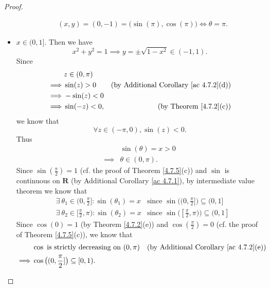 \begin{proof}
\begin{itemize}
\begin{align*}
                   & (x, y) = (0, -1) = \big(\sin(\pi), \cos(\pi)\big) \iff \theta = \pi.
              \end{align*}
        \item \(x \in (0, 1]\).
              Then we have
              \[
                  x^2 + y^2 = 1 \implies y = \pm \sqrt{1 - x^2} \in (-1, 1).
              \]
              Since
              \begin{align*}
                           & z \in (0, \pi)                                                      \\
                  \implies & \sin(z) > 0    & \text{(by Additional Corollary \ref{ac 4.7.2}(d))} \\
                  \implies & -\sin(z) < 0                                                        \\
                  \implies & \sin(-z) < 0,  & \text{(by Theorem \ref{4.7.2}(c))}
              \end{align*}
              we know that
              \[
                  \forall z \in (-\pi, 0), \sin(z) < 0.
              \]
              Thus
              \begin{align*}
                           & \sin(\theta) = x > 0 \\
                  \implies & \theta \in (0, \pi).
              \end{align*}
              Since \(\sin(\frac{\pi}{2}) = 1\) (cf. the proof of Theorem \ref{4.7.5}(c)) and \(\sin\) is continuous on \(\mathbf{R}\) (by Additional Corollary \ref{ac 4.7.1}), by intermediate value theorem we know that
              \begin{align*}
                   & \exists\ \theta_1 \in (0, \frac{\pi}{2}] : \sin(\theta_1) = x   & \text{since } \sin\big((0, \frac{\pi}{2}]\big) \subseteq (0, 1]   \\
                   & \exists\ \theta_2 \in [\frac{\pi}{2}, \pi) : \sin(\theta_2) = x & \text{since } \sin\big([\frac{\pi}{2}, \pi)\big) \subseteq (0, 1]
              \end{align*}
              Since \(\cos(0) = 1\) (by Theorem \ref{4.7.2}(e)) and \(\cos(\frac{\pi}{2}) = 0\) (cf. the proof of Theorem \ref{4.7.5}(c)), we know that
              \begin{align*}
                           & \cos \text{ is strictly decreasing on } (0, \pi)   & \text{(by Additional Corollary \ref{ac 4.7.2}(e))} \\
                  \implies & \cos\big((0, \frac{\pi}{2}]\big) \subseteq [0, 1).

\end{align*}
\end{itemize}
\end{proof}

